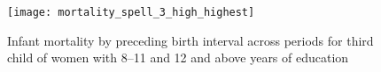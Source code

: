 \documentclass[12pt,letterpaper]{article}
\begin{document}
\begin{figure}
\centering
\texttt{[image: mortality\_spell\_3\_high\_highest]}
\caption{Infant mortality by preceding birth interval across periods for third child of women with 
8--11 and 12 and above years of education}
\label{fig:mortality_high_highest_spell_3}
\end{figure}





\end{document}
